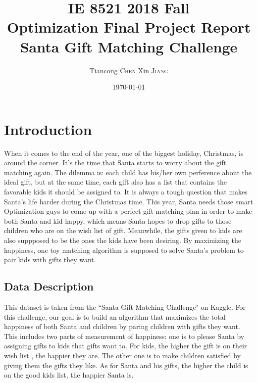 \documentclass[12pt]{article}
\title{IE 8521 2018 Fall \\ Optimization Final Project Report \\ Santa Gift Matching Challenge} %
\author{Tiancong \textsc{Chen}  \hspace{10mm}  Xin \textsc{Jiang}} %
\date{\today} %
\begin{document}
\maketitle %


\section{Introduction}
When it comes to the end of the year, one of the biggest holiday, Christmas, is around the corner. It's the time that Santa starts to worry about the gift matching again. The dilemma is: each child has his/her own perference about the ideal gift, but at the same time, each gift also has a list that contains the favorable kids it should be assigned to. It is always a tough question that makes Santa's life harder during the Christmas time. This year, Santa needs those smart Optimization guys to come up with a perfect gift matching plan in order to make both Santa and kid happy, which means Santa hopes to drop gifts to those children who are on the wish list of gift. Meanwhile, the gifts given to kids are also suppposed to be the ones the kids have been desiring. By maximizing the happiness, one toy matching algorithm is supposed to solve Santa's problem to pair kids with gifts they want.

\subsection{Data Description}
This dataset is taken from the ``Santa Gift Matching Challenge" on Kaggle. For this challenge, our goal is to build an algorithm that maximizes the total happiness of both Santa and children by paring children with gifts they want. This includes two parts of measurement of happiness: one is to please Santa by assigning gifts to kids that gifts want to. For kids, the higher the gift is on their wish list , the happier they are. The other one is to make children satisfied by giving them the gifts they like. As for Santa and his gifts, the higher the child is on the good kids list, the happier Santa is.
\end{document}
